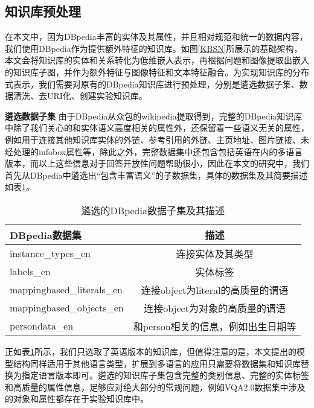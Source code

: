 \subsection{知识库预处理}
在本文中，因为DBpedia丰富的实体及其属性，并且相对规范和统一的数据内容，我们使用DBpedia作为提供额外特征的知识库。如图\ref{KBSN}所展示的基础架构，本文会将知识库的实体和关系转化为低维嵌入表示，再根据问题和图像提取出嵌入的知识库子图，并作为额外特征与图像特征和文本特征融合。为实现知识库的分布式表示，我们需要对原有的DBpedia知识库进行预处理，分别是遴选数据子集、数据清洗、去URI化、创建实验知识库。

\textbf{遴选数据子集}\qquad
由于DBpedia从众包的wikipedia提取得到，完整的DBpedia知识库中除了我们关心的和实体语义高度相关的属性外，还保留着一些语义无关的属性，例如用于连接其他知识库实体的外链、参考引用的外链、主页地址、图片链接、未经处理的infobox属性等，除此之外，完整数据集中还包含包括英语在内的多语言版本，而以上这些信息对于回答开放性问题帮助很小，因此在本文的研究中，我们首先从DBpedia中遴选出“包含丰富语义”的子数据集，具体的数据集及其简要描述如表\ref{dbpeidaList}。
\begin{table}[H]
\centering
\caption{遴选的DBpedia数据子集及其描述}
\begin{tabular*}{0.9\textwidth}{lc}
\toprule
DBpedia数据集 & 描述\\
\midrule
instance\_types\_en & 连接实体及其类型 \\
labels\_en & 实体标签 \\
mappingbased\_literals\_en & 连接object为literal的高质量的谓语 \\
mappingbased\_objects\_en & 连接object为对象的高质量的谓语 \\
persondata\_en & 和person相关的信息，例如出生日期等 \\
\bottomrule
\end{tabular*}
\label{dbpeidaList}
\end{table}

正如表\ref{dbpeidaList}所示，我们只选取了英语版本的知识库，但值得注意的是，本文提出的模型结构同样适用于其他语言类型，扩展到多语言的应用只需要将数据集和知识库替换为指定语言版本即可。遴选的知识库子集包含完整的类别信息、完整的实体标签和高质量的属性信息，足够应对绝大部分的常规问题，例如VQA2.0数据集中涉及的对象和属性都存在于实验知识库中。


